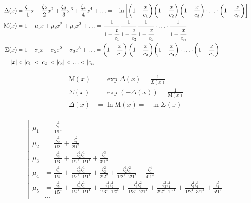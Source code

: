 \begin{equation*} \begin{aligned}
\Delta(x) &=
  \frac{\zeta_1}{1} x
+ \frac{\zeta_2}{2} x^2
+ \frac{\zeta_3}{3} x^3
+ \frac{\zeta_4}{4} x^4
+ \ldots =
- \ln{
  \left[
  \left(1 - \frac{x}{c_1} \right)
  \left(1 - \frac{x}{c_2} \right)
  \left(1 - \frac{x}{c_3} \right)
  \cdot \ldots \cdot
  \left(1 - \frac{x}{c_n} \right)
  \right]
  } \\
%
\mathrm{M}(x) &=
  1
+ \mu_1 x
+ \mu_2 x^2
+ \mu_3 x^3
+ \ldots =
  \frac{1}{1 - \cfrac{x}{c_1}}
  \frac{1}{1 - \cfrac{x}{c_2}}
  \frac{1}{1 - \cfrac{x}{c_3}}
  \cdot \ldots \cdot
  \frac{1}{1 - \cfrac{x}{c_n}} \\
%
\Sigma(x) &=
  1
- \sigma_1 x
+ \sigma_2 x^2
- \sigma_3 x^3
+ \ldots =
  \left(1 - \frac{x}{c_1} \right)
  \left(1 - \frac{x}{c_2} \right)
  \left(1 - \frac{x}{c_3} \right)
  \cdot \ldots \cdot 
  \left(1 - \frac{x}{c_n} \right) \\
%
|x| &< |c_1| < |c_2| < |c_3| < \ldots < |c_n| \\
\end{aligned} \end{equation*}

\begin{equation*} \begin{aligned}
\mathrm{M}(x) &= \exp{\Delta(x)} = \frac{1}{\Sigma(x)} \\
\Sigma(x) &= \exp{(- \Delta(x))} = \frac{1}{\mathrm{M}(x)} \\
\Delta(x) &= \ln{\mathrm{M}(x)} = - \ln{\Sigma(x)} \\
\end{aligned} \end{equation*}

\begin{equation*} \left| \begin{aligned} 
\mu_1 &
= \frac{\zeta_1^1}{1!1^1} \\ 
%
\mu_2 &
= \frac{\zeta_2^1}{1!2^1} 
+ \frac{\zeta_1^2}{2!1^2} \\
%
\mu_3 &
= \frac{\zeta_3^1}{1!3^1} 
+ \frac{\zeta_2^1 \zeta_1^1}{1!2^1 \cdot 1!1^1} 
+ \frac{\zeta_1^3}{3!1^3} \\
%
\mu_4 &
= \frac{\zeta_4^1}{1!4^1} 
+ \frac{\zeta_3^1 \zeta_1^1}{1!3^1 \cdot 1!1^1} 
+ \frac{\zeta_2^2}{2!2^2} 
+ \frac{\zeta_2^1 \zeta_1^2}{1!2^1 \cdot 2!1^2} 
+ \frac{\zeta_1^4}{4!1^4} \\
%
\mu_5 &
= \frac{\zeta_5^1}{1!5^1}
+ \frac{\zeta_4^1 \zeta_1^1}{1!4^1 \cdot 1!1^1}
+ \frac{\zeta_3^1 \zeta_2^1}{1!3^1 \cdot 1!2^1}
+ \frac{\zeta_3^1 \zeta_1^2}{1!3^1 \cdot 2!1^2}
+ \frac{\zeta_2^2 \zeta_1^1}{2!2^2 \cdot 1!1^1}
+ \frac{\zeta_2^1 \zeta_1^3}{1!2^1 \cdot 3!1^3}
+ \frac{\zeta_1^5}{5!1^5} \\
%
&\ldots
\end{aligned} \right. \end{equation*}

